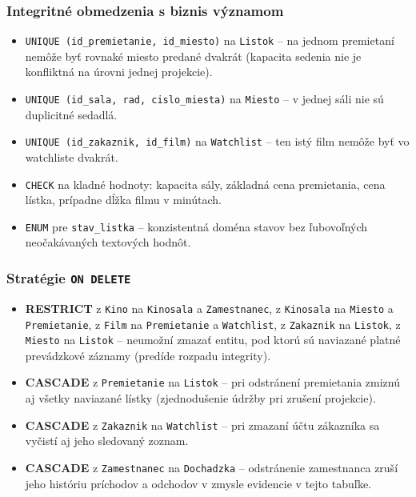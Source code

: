 \documentclass[11pt, a4paper]{article}
\begin{document}
\subsubsection*{Integritné obmedzenia s biznis významom}
\begin{itemize}
    \item \texttt{UNIQUE (id\_premietanie, id\_miesto)} na \texttt{Listok} -- na jednom premietaní nemôže byť rovnaké miesto predané dvakrát (kapacita sedenia nie je konfliktná na úrovni jednej projekcie).
    \item \texttt{UNIQUE (id\_sala, rad, cislo\_miesta)} na \texttt{Miesto} -- v jednej sáli nie sú duplicitné sedadlá.
    \item \texttt{UNIQUE (id\_zakaznik, id\_film)} na \texttt{Watchlist} -- ten istý film nemôže byť vo watchliste dvakrát.
    \item \texttt{CHECK} na kladné hodnoty: kapacita sály, základná cena premietania, cena lístka, prípadne dĺžka filmu v minútach.
    \item \texttt{ENUM} pre \texttt{stav\_listka} -- konzistentná doména stavov bez ľubovoľných neočakávaných textových hodnôt.
\end{itemize}

\subsubsection*{Stratégie \texttt{ON DELETE}}
\begin{itemize}
    \item \textbf{RESTRICT} z \texttt{Kino} na \texttt{Kinosala} a \texttt{Zamestnanec}, z \texttt{Kinosala} na \texttt{Miesto} a \texttt{Premietanie}, z \texttt{Film} na \texttt{Premietanie} a \texttt{Watchlist}, z \texttt{Zakaznik} na \texttt{Listok}, z \texttt{Miesto} na \texttt{Listok} -- neumožní zmazať entitu, pod ktorú sú naviazané platné prevádzkové záznamy (predíde rozpadu integrity).
    \item \textbf{CASCADE} z \texttt{Premietanie} na \texttt{Listok} -- pri odstránení premietania zmiznú aj všetky naviazané lístky (zjednodušenie údržby pri zrušení projekcie).
    \item \textbf{CASCADE} z \texttt{Zakaznik} na \texttt{Watchlist} -- pri zmazaní účtu zákazníka sa vyčistí aj jeho sledovaný zoznam.
    \item \textbf{CASCADE} z \texttt{Zamestnanec} na \texttt{Dochadzka} -- odstránenie zamestnanca zruší jeho históriu príchodov a odchodov v zmysle evidencie v tejto tabuľke.
\end{itemize}
\end{document}
